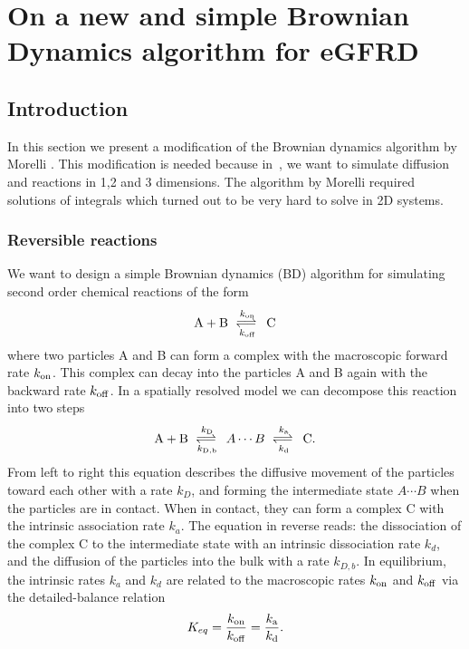 \section{On a new and simple Brownian Dynamics algorithm for eGFRD}

\subsection{Introduction}

In this section we present a modification of the Brownian dynamics algorithm by Morelli \cite{Morelli2008a}. This modification is needed because in \GFRD\,, we want to simulate diffusion and reactions in 1,2 and 3 dimensions. The algorithm by Morelli required solutions of integrals which turned out to be very hard to solve in 2D systems.

\subsubsection{Reversible reactions}
We want to design a simple Brownian dynamics (BD) algorithm for simulating second order chemical reactions of the form
\begin{equation}
{\rm A} + {\rm B} \rates{k_{\rm on}}{k_{\rm off}} {\rm C}
\end{equation}
where two particles A and B can form a complex with the macroscopic forward rate $k_{\rm on}$. This complex can decay into the particles A and B again with the backward rate $k_{\rm off}$. In a spatially resolved model we can decompose this reaction into two steps \cite{Agmon1990}
\begin{equation}
{\rm A} + {\rm B} \rates{k_{\rm D}}{k_{\rm D,b}} A \cdots B \rates{k_{\rm a}}{k_{\rm d}} {\rm C}.
\end{equation}
From left to right this equation describes the diffusive movement of the particles toward each other with a rate $k_D$, and forming the intermediate state $A \cdots B$ when the particles are in contact.  When in contact, they can form a complex C with the intrinsic association rate $k_a$. The equation in reverse reads: the dissociation of the complex C to the intermediate state with an intrinsic dissociation rate $k_d$, and the diffusion of the particles into the bulk with a rate $k_{D,b}$. In equilibrium, the intrinsic rates $k_a$ and $k_d$ are related to the macroscopic rates $k_{\rm on}$ and $k_{\rm off}$ via the detailed-balance relation
\begin{equation}
K_{eq} = \frac{k_{\rm on}}{k_{\rm off}} = \frac{k_{\rm a}}{k_{\rm d}}.
\end{equation}

